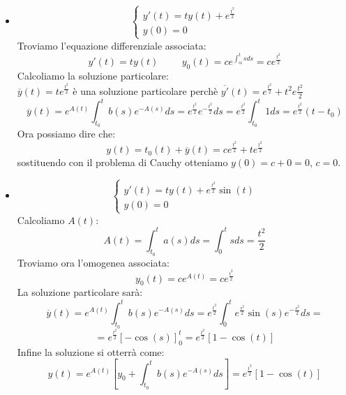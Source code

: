 \begin{example}\phantom{}
\begin{itemize}
    \item \begin{equation*}\begin{cases}y'(t)=ty(t)+e^{\frac{t^2}{2}}\\y(0)=0\end{cases}\end{equation*}
    Troviamo l'equazione differenziale associata:
    \begin{equation*}y'(t)=ty(t)\hspace{1cm}y_0(t)=ce^{\int^t_\alpha sds}=ce^{\frac{t^2}{2}}\end{equation*}
    Calcoliamo la soluzione particolare:\\$\overline{y}(t)=te^{\frac{t^2}{2}}$ è una soluzione particolare perchè $\overline{y'}(t)=e^{\frac{t^2}{2}}+t^2e{\frac{t^2}{2}}$
    \begin{equation*}\overline{y}(t)=e^{A(t)}\int^t_{t_0}b(s)e^{-A(s)}ds=e^{\frac{t^2}{2}}e^{-\frac{t^2}{2}}ds=e^{\frac{t^2}{2}}\int^t_{t_0}1ds=e^{\frac{t^2}{2}}(t-t_0)\end{equation*}
    Ora possiamo dire che:
    \begin{equation*}y(t)=t_0(t)+\overline{y}(t)=ce^{\frac{t^2}{2}}+te^{\frac{t^2}{2}}\end{equation*}
    sostituendo con il problema di Cauchy otteniamo $y(0)=c+0=0$, $c=0$.
    
    \item \begin{equation*}\begin{cases}y'(t)=ty(t)+e^{\frac{t^2}{2}}\sin(t)\\y(0)=0\end{cases}\end{equation*}
        Calcoliamo $A(t)$:\begin{equation*}A(t)=\int^t_{t_0}a(s)ds=\int^t_{0}sds=\frac{t^2}{2}\end{equation*}
        Troviamo ora l'omogenea associata: \begin{equation*}y_0(t)=ce^{A(t)}=ce^{\frac{t^2}{2}}\end{equation*}
        La soluzione particolare sarà: \begin{equation*}\overline{y}(t)=e^{A(t)}\int^t_{t_0}b(s)e^{-A(s)}ds=e^{\frac{t^2}{2}}\int^t_0e^{\frac{s^2}{2}}\sin(s)e^{-\frac{s^2}{2}}ds=\end{equation*}
        \begin{equation*}=e^{\frac{t^2}{2}}[-\cos(s)]^t_0=e^{\frac{t^2}{2}}[1-\cos(t)]\end{equation*}
        Infine la soluzione si otterrà come:
        \begin{equation*}y(t)=e^{A(t)}\left[y_0+\int^t_{t_0}b(s)e^{-A(s)}ds\right]=e^{\frac{t^2}{2}}[1-\cos(t)]\end{equation*}
\end{itemize}
\end{example}


